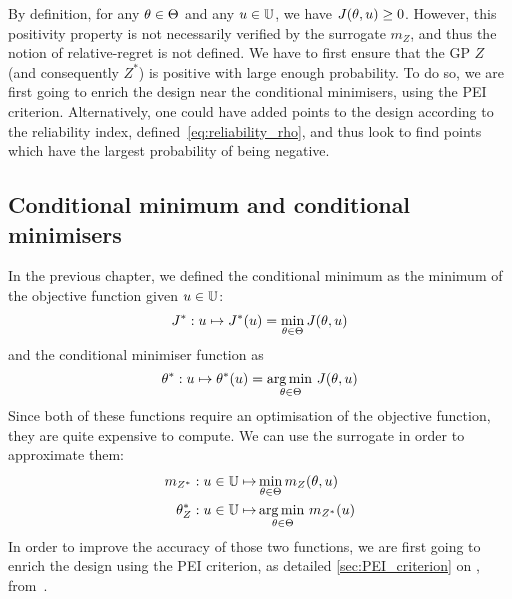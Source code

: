 \documentclass[../../Main_ManuscritThese.tex]{subfiles}
\begin{document}
By definition, for any $\theta\in \Theta$ and any $u \in \mathbb{U}$, we
have $J(\theta, u) \geq 0$.  However, this positivity property is not
necessarily verified by the surrogate $m_Z$, and thus the notion of
relative-regret is not defined. We have to first ensure that the GP
$Z$ (and consequently $Z^*$) is positive with large enough
probability.  To do so, we are first going to enrich the design near
the conditional minimisers, using the PEI criterion.  Alternatively,
one could have added points to the design according to the reliability
index, defined~\cref{eq:reliability_rho}, and thus look to find points
which have the largest probability of being negative.

\subsection{Conditional minimum and conditional minimisers}
\label{ssec:croco_cond_minimum_minimisers}
In the previous chapter, we defined the conditional minimum as the
minimum of the objective function given $u\in \mathbb{U}$:
\begin{equation}
  J^* : u \mapsto J^*(u) = \min_{\theta\in\Theta} J(\theta, u)
\end{equation}
and the conditional minimiser function as
\begin{equation}
  \theta^*:u  \mapsto \theta^*(u) = \operatorname*{arg\,min \,}_{\theta \in \Theta} J(\theta, u)
\end{equation}
Since both of these functions require an optimisation of the objective
function, they are quite expensive to compute. We can use the
surrogate in order to approximate them:
\begin{align}
  m_{Z^*}: u\in\mathbb{U} \mapsto &\min_{\theta \in \Theta} m_Z(\theta, u) \\
  \theta^*_{Z}: u \in \mathbb{U} \mapsto &\operatorname*{arg\,min \,}_{\theta \in \Theta} m_{Z^*}(u)
\end{align}
In order to improve the accuracy of those two functions, we are first
going to enrich the design using the PEI criterion, as detailed
\cref{sec:PEI_criterion} on ,
from~\cite{ginsbourger_bayesian_2014}.
\end{document}
